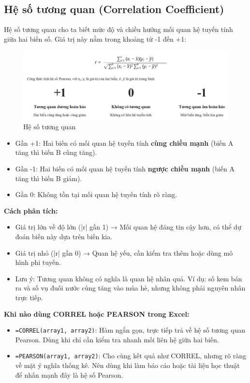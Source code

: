 \documentclass[11pt]{article}
\begin{document}
\subsection{Hệ số tương quan (Correlation Coefficient)}

Hệ số tương quan cho ta biết mức độ và chiều hướng mối quan hệ tuyến tính giữa hai biến số. Giá trị này nằm trong khoảng từ -1 đến +1:

\begin{figure}[H]
    \centering
    \includegraphics[width=0.7\linewidth]{images/pearson.png}
    \caption{Hệ số tương quan}
    \label{fig:pearson}
\end{figure}


\begin{itemize}
    \item Gần +1: Hai biến có mối quan hệ tuyến tính \textbf{cùng chiều mạnh} (biến A tăng thì biến B cũng tăng).
    \item Gần -1: Hai biến có mối quan hệ tuyến tính \textbf{ngược chiều mạnh} (biến A tăng thì biến B giảm).
    \item Gần 0: Không tồn tại mối quan hệ tuyến tính rõ ràng.
\end{itemize}

\textbf{Cách phân tích:}
\begin{itemize}
    \item Giá trị lớn về độ lớn (|r| gần 1) → Mối quan hệ đáng tin cậy hơn, có thể dự đoán biến này dựa trên biến kia.
    \item Giá trị nhỏ (|r| gần 0) → Quan hệ yếu, cần kiểm tra thêm hoặc dùng mô hình phi tuyến.
    \item Lưu ý: Tương quan không có nghĩa là quan hệ nhân quả. Ví dụ: số kem bán ra và số vụ đuối nước cùng tăng vào mùa hè, nhưng không phải nguyên nhân trực tiếp.
\end{itemize}

\textbf{Khi nào dùng CORREL hoặc PEARSON trong Excel:}
\begin{itemize}
    \item \texttt{=CORREL(array1, array2)}: Hàm ngắn gọn, trực tiếp trả về hệ số tương quan Pearson. Dùng khi chỉ cần kiểm tra nhanh mối liên hệ giữa hai biến.
    \item \texttt{=PEARSON(array1, array2)}: Cho cùng kết quả như CORREL, nhưng rõ ràng về mặt ý nghĩa thống kê. Nên dùng khi làm báo cáo hoặc tài liệu học thuật để nhấn mạnh đây là hệ số Pearson.
\end{itemize}
\end{document}
